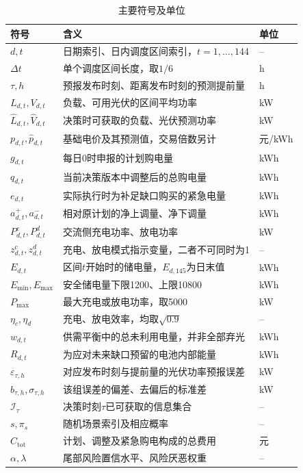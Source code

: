 \documentclass[withoutpreface,bwprint]{cumcmthesis}
\begin{document}
\begin{table}[H]
\centering
\caption{主要符号及单位}
\label{tab:global-symbols}
\renewcommand{\arraystretch}{1.12}
\small
\begin{tabularx}{\textwidth}{>{\centering\arraybackslash}p{3.2cm}X>{\centering\arraybackslash}p{2.1cm}}
\toprule
符号 & 含义 & 单位\\
\midrule
$d,t$ & 日期索引、日内调度区间索引，$t=1,\ldots,144$ & --\\
$\Delta t$ & 单个调度区间长度，取$1/6$ & h\\
$\tau,h$ & 预报发布时刻、距离发布时刻的预测提前量 & h\\
$L_{d,t},V_{d,t}$ & 负载、可用光伏的区间平均功率 & kW\\
$\widehat L_{d,t},\widehat V_{d,t}$ & 决策时可获取的负载、光伏预测功率 & kW\\
$p_{d,t},\widehat p_{d,t}$ & 基础电价及其预测值，交易倍数另计 & 元/kWh\\
$g_{d,t}$ & 每日0时申报的计划购电量 & kWh\\
$q_{d,t}$ & 当前决策版本中调整后的总购电量 & kWh\\
$e_{d,t}$ & 实际执行时为补足缺口购买的紧急电量 & kWh\\
$a^+_{d,t},a^-_{d,t}$ & 相对原计划的净上调量、净下调量 & kWh\\
$P^c_{d,t},P^d_{d,t}$ & 交流侧充电功率、放电功率 & kW\\
$z^c_{d,t},z^d_{d,t}$ & 充电、放电模式指示变量，二者不可同时为1 & --\\
$E_{d,t}$ & 区间$t$开始时的储电量，$E_{d,145}$为日末值 & kWh\\
$E_{\min},E_{\max}$ & 安全储电量下限1200、上限10800 & kWh\\
$P_{\max}$ & 最大充电或放电功率，取5000 & kW\\
$\eta_c,\eta_d$ & 充电、放电效率，均取$\sqrt{0.9}$ & --\\
$w_{d,t}$ & 供需平衡中的总未利用电量，并非全部弃光 & kWh\\
$R_{d,t}$ & 为应对未来缺口预留的电池内部能量 & kWh\\
$\varepsilon_{\tau,h}$ & 对应发布时刻与提前量的光伏功率预报误差 & kW\\
$b_{\tau,h},\sigma_{\tau,h}$ & 该组误差的偏差、去偏后的标准差 & kW\\
$\mathcal I_\tau$ & 决策时刻$\tau$已可获取的信息集合 & --\\
$s,\pi_s$ & 随机场景索引及相应概率 & --\\
$C_{\mathrm{tot}}$ & 计划、调整及紧急购电构成的总费用 & 元\\
$\alpha,\lambda$ & 尾部风险置信水平、风险厌恶权重 & --\\
\bottomrule
\end{tabularx}
\end{table}
\end{document}
